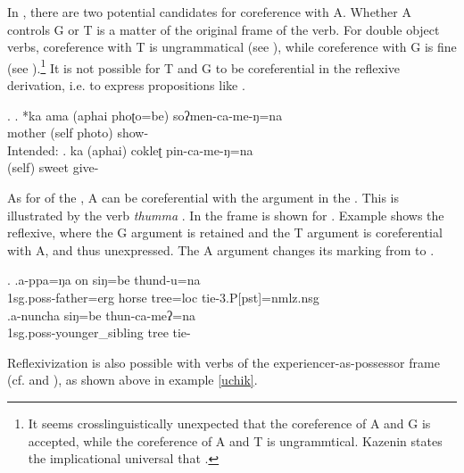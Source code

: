 In , there are two potential candidates for coreference with A. Whether A controls G or T is a matter of the original frame of the verb. For double object verbs, coreference with T is ungrammatical (see \Next[a]), while coreference with G is fine (see \Next[b]).\footnote{It seems crosslinguistically unexpected that the coreference of A and G is accepted, while the coreference of A and T is ungrammtical. Kazenin states the implicational universal that  \citep[918]{Kazenin2001_Verbal}. } It is not possible for T and G to be coreferential in the reflexive derivation, i.e. to express propositions like .

\ex. \ag. *ka ama (aphai phoʈo=be)  soʔmen-ca-me-ŋ=na\\
 mother (self photo) show- \\
Intended: 
	\bg. ka (aphai) cokleʈ pin-ca-me-ŋ=na\\
		 (self) sweet give-\\


As for  of the , A can be coreferential with the argument in the . This is illustrated by the verb \emph{thumma} .  In \Next[a] the  frame is shown for . Example \Next[b] shows the reflexive, where the  G argument is retained and the  T argument is coreferential with A, and thus unexpressed. The A argument changes its  marking from  to .  

\ex. \ag.a-ppa=ŋa on siŋ=be thund-u=na\\
		{\sc 1sg.poss}-father{\sc =erg} horse tree{\sc =loc} tie{\sc -3.P[pst]=nmlz.nsg}	\\
 	\bg.a-nuncha siŋ=be thun-ca-meʔ=na\\
{\sc 1sg.poss}-younger\_sibling tree tie-\\


Reflexivization is also possible with verbs of the experiencer-as-possessor frame (cf.  and ), as shown above in example \ref{uchik}.


